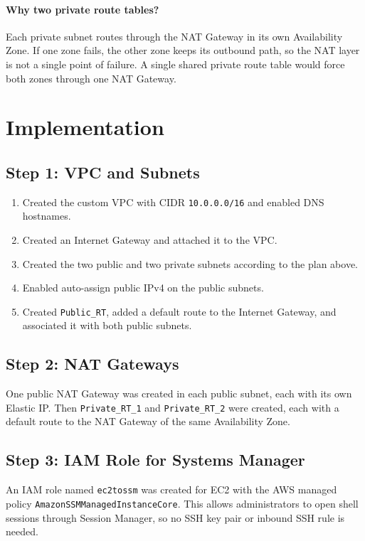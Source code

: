 \documentclass[11pt,a4paper]{article}
\begin{document}
\paragraph{Why two private route tables?}
Each private subnet routes through the NAT Gateway in its own Availability Zone. If one zone fails, the other zone keeps its outbound path, so the NAT layer is not a single point of failure. A single shared private route table would force both zones through one NAT Gateway.

\section{Implementation}

\subsection{Step 1: VPC and Subnets}
\begin{enumerate}
  \item Created the custom VPC with CIDR \texttt{10.0.0.0/16} and enabled DNS hostnames.
  \item Created an Internet Gateway and attached it to the VPC.
  \item Created the two public and two private subnets according to the plan above.
  \item Enabled auto-assign public IPv4 on the public subnets.
  \item Created \texttt{Public\_RT}, added a default route to the Internet Gateway, and associated it with both public subnets.
\end{enumerate}


\subsection{Step 2: NAT Gateways}
One public NAT Gateway was created in each public subnet, each with its own Elastic IP. Then \texttt{Private\_RT\_1} and \texttt{Private\_RT\_2} were created, each with a default route to the NAT Gateway of the same Availability Zone.


\subsection{Step 3: IAM Role for Systems Manager}
An IAM role named \texttt{ec2tossm} was created for EC2 with the AWS managed policy \texttt{AmazonSSMManagedInstanceCore}. This allows administrators to open shell sessions through Session Manager, so no SSH key pair or inbound SSH rule is needed.
\end{document}
